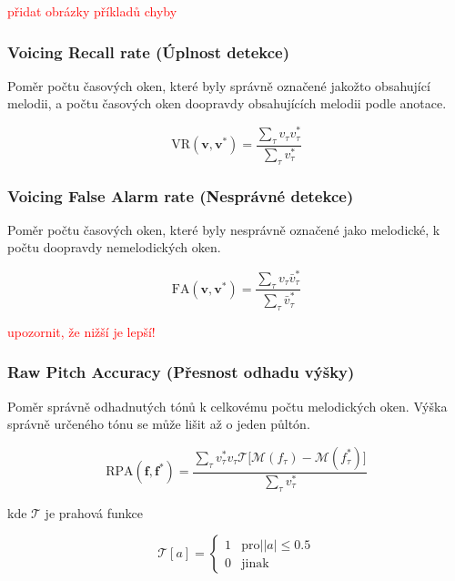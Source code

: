 \textcolor{red}{přidat obrázky příkladů chyby}

\subsubsection{Voicing Recall rate (Úplnost detekce)}

Poměr počtu časových oken, které byly správně označené jakožto obsahující melodii, a počtu časových oken doopravdy obsahujících melodii podle anotace.

    $$\mathrm{VR}(\mathbf{v}, \mathbf{v^*}) = \frac{\sum_\tau{v_\tau v^*_\tau}}{\sum_\tau{v^*_\tau}}$$



\subsubsection{Voicing False Alarm rate (Nesprávné detekce)}

Poměr počtu časových oken, které byly nesprávně označené jako melodické, k počtu doopravdy nemelodických oken.

    $$\mathrm{FA}(\mathbf{v}, \mathbf{v^*}) = \frac{\sum_\tau{v_\tau \bar{v}^*_\tau}}{\sum_\tau{\bar{v}^*_\tau}}$$


\textcolor{red}{upozornit, že nižší je lepší!}


\subsubsection{Raw Pitch Accuracy (Přesnost odhadu výšky)}

Poměr správně odhadnutých tónů k celkovému počtu melodických oken. Výška správně určeného tónu se může lišit až o jeden půltón.


    $$\mathrm{RPA}(\mathbf{f}, \mathbf{f^*}) = \frac{\sum_\tau{v^*_\tau v_\tau \mathcal{T}[\mathcal{M}(f_\tau) - \mathcal{M}(f^*_\tau)}] }{\sum_\tau{v^*_\tau}}$$

kde $\mathcal{T}$ je prahová funkce

    \begin{equation*}
        \mathcal{T}[a] = \begin{cases}
                1 & \mathrm{pro} \lvert |a| \le 0.5 \\
                0 & \text{jinak}
                
            \end{cases}
    \end{equation*}

